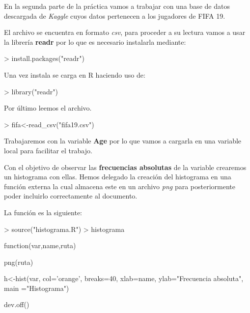 \documentclass [a4paper] {article}
\begin{document}
\newpage
En la segunda parte de la pr\'actica vamos a trabajar con una base de datos descargada de
\textit{Kaggle} cuyos datos pertenecen a los jugadores de FIFA 19.

\bigskip
El archivo se encuentra en formato \textit{csv}, para proceder a su lectura vamos a usar la 
librer\'ia \textbf{readr} por lo que es necesario instalarla mediante:
\begin{Schunk}
\begin{Sinput}
> install.packages("readr")
\end{Sinput}
\end{Schunk}

\bigskip
Una vez instala se carga en R haciendo uso de:
\begin{Schunk}
\begin{Sinput}
> library("readr")
\end{Sinput}
\end{Schunk}

\bigskip
Por \'ultimo leemos el archivo.
\begin{Schunk}
\begin{Sinput}
> fifa<-read_csv("fifa19.csv")
\end{Sinput}
\end{Schunk}

\bigskip
Trabajaremos con la variable \textbf{Age} por lo que vamos a cargarla en una variable
local para facilitar el trabajo.
\begin{Schunk}
\end{Schunk}

\bigskip
Con el objetivo de observar las \textbf{frecuencias absolutas} de la variable crearemos un histograma con ellas. Hemos delegado
la creaci\'on del histograma en una funci\'on externa la cual almacena este en un archivo \textit{png} para posteriormente poder incluirlo
correctamente al documento.

La funci\'on es la siguiente:
\begin{Schunk}
\begin{Sinput}
> source("histograma.R")
> histograma
\end{Sinput}
\begin{Soutput}
function(var,name,ruta) {
    png(ruta)
 
    h<-hist(var, col='orange', breaks=40, xlab=name, 
            ylab="Frecuencia absoluta", main ="Histograma") 

    dev.off()
}
\end{Soutput}
\end{Schunk}
\end{document}
